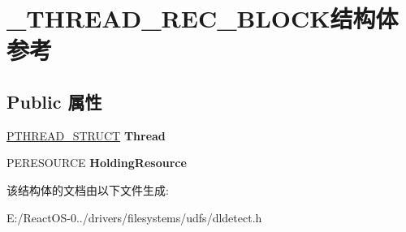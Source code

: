 \hypertarget{struct___t_h_r_e_a_d___r_e_c___b_l_o_c_k}{}\section{\+\_\+\+T\+H\+R\+E\+A\+D\+\_\+\+R\+E\+C\+\_\+\+B\+L\+O\+C\+K结构体 参考}
\label{struct___t_h_r_e_a_d___r_e_c___b_l_o_c_k}
\subsection*{Public 属性}
\begin{DoxyCompactItemize}
\item 
\mbox{\label{struct___t_h_r_e_a_d___r_e_c___b_l_o_c_k_a6ee9b6ca36169d44edc3d58800a01761}} 
\hyperlink{struct___t_h_r_e_a_d___s_t_r_u_c_t}{P\+T\+H\+R\+E\+A\+D\+\_\+\+S\+T\+R\+U\+CT} {\bfseries Thread}
\item 
\mbox{\label{struct___t_h_r_e_a_d___r_e_c___b_l_o_c_k_a84142305802d7ffad2b6fb7319a1651f}} 
P\+E\+R\+E\+S\+O\+U\+R\+CE {\bfseries Holding\+Resource}
\end{DoxyCompactItemize}


该结构体的文档由以下文件生成\+:\begin{DoxyCompactItemize}
\item 
E\+:/\+React\+O\+S-\/0../drivers/filesystems/udfs/dldetect.\+h\end{DoxyCompactItemize}

